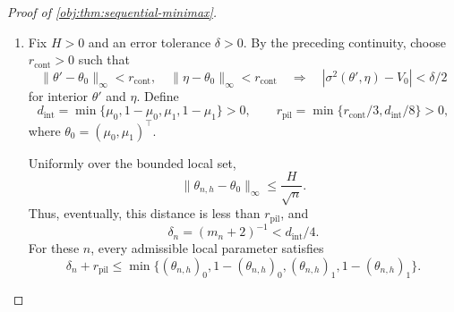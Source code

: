 \begin{proof}[Proof of \cref{obj:thm:sequential-minimax}]
\begin{enumerate}
Subtracting the diagonal second-moment identity from the definition of \(\sigma^2\) gives the exact expression
\[
\begin{aligned}
\sigma^2(\theta',\eta)-V^*(\eta,p,\varepsilon)
&=
\sum_S
\alpha_{\eta,S}\bigl(h_S(\theta')-h_S(\eta)\bigr)
\phi_\eta(S)^2\\
&\qquad-
\bigl(\tau(\theta')-\tau(\eta)\bigr)^2.
\end{aligned}
\]
Using \(0\le\alpha_{\eta,S}\le1\) and \(|\phi_\eta(S)|\le C_\phi\), we obtain
\[
\begin{aligned}
|\sigma^2(\theta',\eta)-V^*(\eta,p,\varepsilon)|
&\le
C_\phi^2\sum_S|h_S(\theta')-h_S(\eta)|\\
&\qquad+
\bigl(\tau(\theta')-\tau(\eta)\bigr)^2.
\end{aligned}
\]
The right-hand side tends to zero as
\((\theta',\eta)\to(\theta_0,\theta_0)\). Hence
\[
\sigma^2(\theta',\eta)\longrightarrow V_0
\quad\text{as }(\theta',\eta)\to(\theta_0,\theta_0).
\]

\item
Fix \(H>0\) and an error tolerance \(\delta>0\). By the preceding continuity, choose \(r_{\mathrm{cont}}>0\) such that
\[
\|\theta'-\theta_0\|_\infty<r_{\mathrm{cont}},
\quad
\|\eta-\theta_0\|_\infty<r_{\mathrm{cont}}
\quad\Longrightarrow\quad
|\sigma^2(\theta',\eta)-V_0|<\delta/2
\]
for interior \(\theta'\) and \(\eta\). Define
\[
d_{\mathrm{int}}
=
\min\{\mu_0,1-\mu_0,\mu_1,1-\mu_1\}>0,
\qquad
r_{\mathrm{pil}}
=
\min\{r_{\mathrm{cont}}/3,d_{\mathrm{int}}/8\}>0,
\]
where \(\theta_0=(\mu_0,\mu_1)^\top\).

Uniformly over the bounded local set,
\[
\|\theta_{n,h}-\theta_0\|_\infty
\le\frac H{\sqrt n}.
\]
Thus, eventually, this distance is less than \(r_{\mathrm{pil}}\), and
\[
\delta_n=(m_n+2)^{-1}<d_{\mathrm{int}}/4.
\]
For these \(n\), every admissible local parameter satisfies
\[
\delta_n+r_{\mathrm{pil}}
\le
\min\{
(\theta_{n,h})_0,1-(\theta_{n,h})_0,
(\theta_{n,h})_1,1-(\theta_{n,h})_1
\}.
\]


\end{enumerate}
\end{proof}
